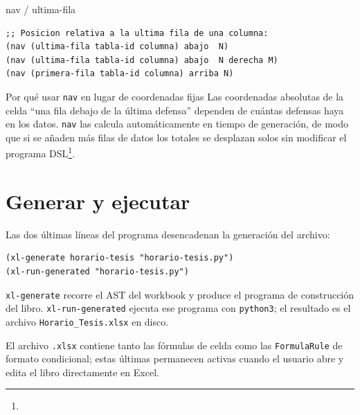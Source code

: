 \documentclass[12pt,a4paper]{report}
\begin{document}


\begin{sintaxisbox}{nav / ultima-fila}
\begin{lstlisting}
;; Posicion relativa a la ultima fila de una columna:
(nav (ultima-fila tabla-id columna) abajo  N)
(nav (ultima-fila tabla-id columna) abajo  N derecha M)
(nav (primera-fila tabla-id columna) arriba N)
\end{lstlisting}
\end{sintaxisbox}


\begin{infobox}{Por qué usar \texttt{nav} en lugar de coordenadas fijas}
Las coordenadas absolutas de la celda ``una fila debajo de la última
defensa'' dependen de cuántas defensas haya en los datos.
\texttt{nav} las calcula automáticamente en tiempo de generación, de modo
que si se añaden más filas de datos los totales se desplazan solos sin
modificar el programa DSL\footnote{}.
\end{infobox}

\section{Generar y ejecutar}
\label{sec:generar}

Las dos últimas líneas del programa desencadenan la generación del archivo:

\begin{lstlisting}[caption={Compilacion y ejecucion desde el programa DSL.}]
(xl-generate horario-tesis "horario-tesis.py")
(xl-run-generated "horario-tesis.py")
\end{lstlisting}

\texttt{xl-generate} recorre el AST del workbook y produce el programa de
construcción del libro.
\texttt{xl-run-generated} ejecuta ese programa con \texttt{python3};
el resultado es el archivo \texttt{Horario\_Tesis.xlsx} en disco.

El archivo \texttt{.xlsx} contiene tanto las fórmulas de celda como las
\texttt{FormulaRule} de formato condicional; estas últimas permanecen
activas cuando el usuario abre y edita el libro directamente en Excel.
\end{document}
